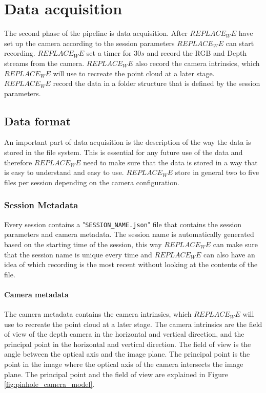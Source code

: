 \section{Data acquisition}
\label{sec:data_acquisition}

The second phase of the pipeline is data acquisition. After $REPLACE_WE$ have set up the camera according to the session parameters $REPLACE_WE$ can start recording. $REPLACE_WE$ set a timer for $30s$ and record the RGB and Depth streams from the camera. $REPLACE_WE$ also record the camera intrinsics, which $REPLACE_WE$ will use to recreate the point cloud at a later stage. $REPLACE_WE$ record the data in a folder structure that is defined by the session parameters.

\subsection{Data format}

An important part of data acquisition is the description of the way the data is stored in the file system. This is essential for any future use of the data and therefore $REPLACE_WE$ need to make sure that the data is stored in a way that is easy to understand and easy to use. $REPLACE_WE$ store in general two to five files per session depending on the camera configuration. 

\subsubsection{Session Metadata}

Every session contains a "\texttt{SESSION\_NAME.json}" file that contains the session parameters and camera metadata. The session name is automatically generated based on the starting time of the session, this way $REPLACE_WE$ can make sure that the session name is unique every time and $REPLACE_WE$ can also have an idea of which recording is the most recent without looking at the contents of the file.

\paragraph{Camera metadata}

The camera metadata contains the camera intrinsics, which $REPLACE_WE$ will use to recreate the point cloud at a later stage. The camera intrinsics are the field of view of the depth camera in the horizontal and vertical direction, and the principal point in the horizontal and vertical direction. The field of view is the angle between the optical axis and the image plane. The principal point is the point in the image where the optical axis of the camera intersects the image plane. The principal point and the field of view are explained in Figure \ref{fig:pinhole_camera_model}.

